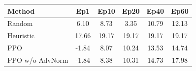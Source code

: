 \begin{tabular}{lccccc}
\toprule
Method & Ep1 & Ep10 & Ep20 & Ep40 & Ep60 \\
\midrule
Random & 6.10 & 8.73 & 3.35 & 10.79 & 12.13 \\
Heuristic & 17.66 & 19.17 & 19.17 & 19.17 & 19.17 \\
PPO & -1.84 & 8.07 & 10.24 & 13.53 & 14.74 \\
PPO w/o AdvNorm & -1.84 & 8.38 & 10.31 & 14.73 & 17.98 \\
\bottomrule
\end{tabular}
